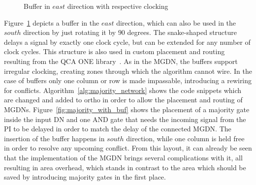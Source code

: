 \begin{figure}
	\caption{Buffer in $east$ direction with respective clocking}\label{fig:QCA_buf}
\end{figure}

Figure~\ref{fig:QCA_buf} depicts a buffer in the $east$ direction, which can also be used in the $south$ direction by just rotating it by $90$ degrees. The snake-shaped structure delays a signal by exactly one clock cycle, but can be extended for any number of clock cycles. This structure is also used in custom placement and routing resulting from the QCA ONE library~\cite{QCA_scl}. As in the MGDN, the buffers support irregular clocking, creating zones through which the algorithm cannot wire. In the case of buffers only one column or row is made impassable, introducing a rewiring for conflicts. Algorithm~\ref{alg:majority_network} shows the code snippets which are changed and added to ortho in order to allow the placement and routing of MGDNs. Figure~\ref{fig:majority_with_buf} shows the placement of a majority gate inside the input DN and one AND gate that needs the incoming signal from the PI to be delayed in order to match the delay of the connected MGDN. The insertion of the buffer happens in $south$ direction, while one column is held free in order to resolve any upcoming conflict. From this layout, it can already be seen that the implementation of the MGDN brings several complications with it, all resulting in area overhead, which stands in contrast to the area which should be saved by introducing majority gates in the first place.

